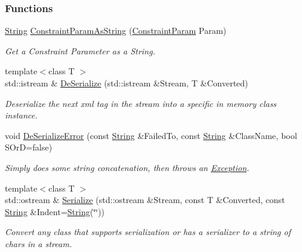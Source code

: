 \subsubsection*{Functions}
\begin{DoxyCompactItemize}
\item 
\hyperlink{namespacephys_aa03900411993de7fbfec4789bc1d392e}{String} \hyperlink{namespacephys_aa509348bc9c47c5a76a81f098319aae7}{ConstraintParamAsString} (\hyperlink{namespacephys_aa1e7cf2d7efcaeaeac304f711e7564e8}{ConstraintParam} Param)
\begin{DoxyCompactList}\small\item\em Get a Constraint Parameter as a String. \item\end{DoxyCompactList}\item 
{\footnotesize template$<$class T $>$ }\\std::istream \& \hyperlink{namespacephys_adbc8714ac6e9a549a5ef261d1bda1505}{DeSerialize} (std::istream \&Stream, T \&Converted)
\begin{DoxyCompactList}\small\item\em Deserialize the next xml tag in the stream into a specific in memory class instance. \item\end{DoxyCompactList}\item 
void \hyperlink{namespacephys_aecaa80117c517257e0af9ebd687ed667}{DeSerializeError} (const \hyperlink{namespacephys_aa03900411993de7fbfec4789bc1d392e}{String} \&FailedTo, const \hyperlink{namespacephys_aa03900411993de7fbfec4789bc1d392e}{String} \&ClassName, bool SOrD=false)
\begin{DoxyCompactList}\small\item\em Simply does some string concatenation, then throws an \hyperlink{classphys_1_1Exception}{Exception}. \item\end{DoxyCompactList}\item 
{\footnotesize template$<$class T $>$ }\\std::ostream \& \hyperlink{namespacephys_aca0ab1969773dbd0d8799bdd6a5cb745}{Serialize} (std::ostream \&Stream, const T \&Converted, const \hyperlink{namespacephys_aa03900411993de7fbfec4789bc1d392e}{String} \&Indent=\hyperlink{namespacephys_aa03900411993de7fbfec4789bc1d392e}{String}(\char`\"{}\char`\"{}))
\begin{DoxyCompactList}\small\item\em Convert any class that supports serialization or has a serializer to a string of chars in a stream. \item\end{DoxyCompactList}\item 

\end{DoxyCompactItemize}
